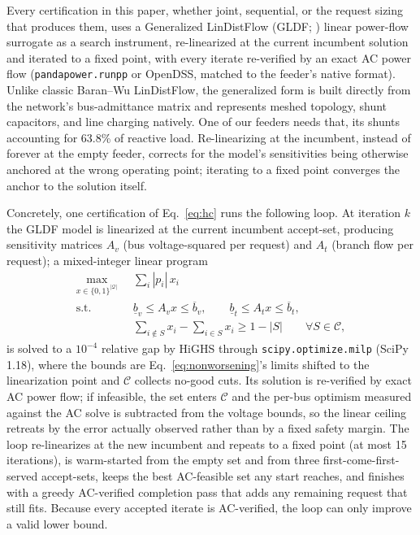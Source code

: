 \documentclass[review,authoryear,12pt]{elsarticle}
\begin{document}
Every certification in this paper, whether joint, sequential, or the request
sizing that produces them, uses a Generalized LinDistFlow (GLDF;
\citealp{huang2021}) linear power-flow surrogate as a search instrument,
re-linearized at the current incumbent solution and iterated to a fixed
point, with every iterate re-verified by an exact AC power flow
(\texttt{pandapower.runpp} or OpenDSS, matched to the feeder's native
format). Unlike classic Baran--Wu LinDistFlow, the generalized form is built
directly from the network's bus-admittance matrix and represents meshed
topology, shunt capacitors, and line charging natively. One of our feeders
needs that, its shunts accounting for 63.8\% of reactive load. Re-linearizing
at the incumbent, instead of forever at the empty feeder, corrects for the
model's sensitivities being otherwise anchored at the wrong operating point;
iterating to a fixed point converges the anchor to the solution itself.

Concretely, one certification of Eq.~\eqref{eq:hc} runs the following loop.
At iteration $k$ the GLDF model is linearized at the current incumbent
accept-set, producing sensitivity matrices $A_v$ (bus voltage-squared per
request) and $A_t$ (branch flow per request); a mixed-integer linear program
\begin{equation}
\begin{aligned}
\max_{x \in \{0,1\}^{|\mathcal{Q}|}} \;\; & \sum_{i} |p_i|\, x_i \\
\text{s.t.} \quad & \underline{b}_v \le A_v x \le \overline{b}_v,
\qquad \underline{b}_t \le A_t x \le \overline{b}_t, \\
& \sum_{i \notin S} x_i - \sum_{i \in S} x_i \ge 1 - |S|
\qquad \forall S \in \mathcal{C},
\end{aligned}
\label{eq:milp}
\end{equation}
is solved to a $10^{-4}$ relative gap by HiGHS \citep{huangfu2018} through
\texttt{scipy.optimize.milp} (SciPy 1.18), where the bounds are
Eq.~\eqref{eq:nonworsening}'s limits shifted to the linearization point and
$\mathcal{C}$ collects no-good cuts. Its solution is re-verified by exact AC
power flow; if infeasible, the set enters $\mathcal{C}$ and the per-bus
optimism measured against the AC solve is subtracted from the voltage bounds,
so the linear ceiling retreats by the error actually observed rather than by a
fixed safety margin. The loop re-linearizes at the new incumbent and repeats to
a fixed point (at most 15 iterations), is warm-started from the empty set and
from three first-come-first-served accept-sets, keeps the best AC-feasible set
any start reaches, and finishes with a greedy AC-verified completion pass that
adds any remaining request that still fits. Because every accepted iterate is
AC-verified, the loop can only improve a valid lower bound.
\end{document}
